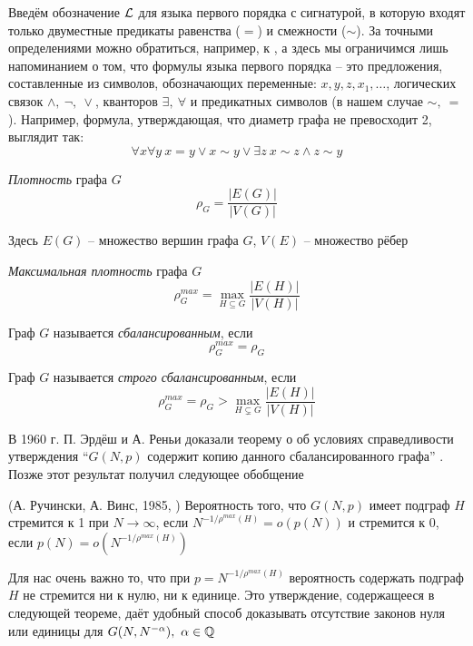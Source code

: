     Введём обозначение $\mathcal{L}$ для языка первого порядка с сигнатурой, в которую входят только двуместные предикаты равенства ($=$) и смежности ($\sim$).
    За точными определениями можно обратиться, например, к
    \cite{shen}, а здесь мы ограничимся лишь напоминанием о том, что формулы языка первого порядка -- это предложения, составленные из символов, обозначающих переменные: 
    $x,y,z,x_1,\ldots$, 
    логических связок 
    $\wedge, ~\neg, ~\vee$, 
    кванторов 
    $\exists, ~\forall$ и 
    предикатных символов (в нашем случае
    $\sim, ~ =$).
    Например, формула, утверждающая, что диаметр графа не превосходит 2, выглядит так:
    \[
    \forall x \forall y ~ x=y \vee x\sim y \vee \exists z ~ x \sim z \wedge z \sim y
    \]
    
    \Def \textit{Плотность} графа $G$ 
   \[ \rho_G = \frac {|E(G)|}{|V(G)|} \]
   
   Здесь $E(G)$ -- множество вершин графа $G$, $V(E)$ -- множество рёбер
   
   \Def \textit{Максимальная плотность} графа $G$
     \[ \rho^{max}_G = \max_{H \subseteq G} \frac {|E(H)|}{|V(H)|} \]
    
    \Def Граф $G$ называется \textit{сбалансированным}, если 
    \[ \rho^{max}_G = \rho_G \]
    
    \Def Граф $G$ называется \textit{строго сбалансированным}, если 
    \[\rho^{max}_G = \rho_G > \max_{H \subsetneq G} \frac {|E(H)|}{|V(H)|} \]
     
В 1960 г. П. Эрдёш и А. Реньи
доказали теорему о об условиях справедливости утверждения “$G(N, p)$ содержит копию данного сбалансированного графа” \cite{erdHos1976evolution}. 
Позже этот результат получил следующее обобщение
    
\begin{theorem} (А. Ручински, А. Винс, 1985, \cite{rucinski1985balanced}) 
\label{th:ruchinski}
Вероятность того, что $G(N, p)$ имеет подграф $H$ стремится к 1 при $N \rightarrow \infty$, если $N^{-1/\rho^{max}(H)} = o(p(N))$ и стремится к  0, если $p(N) = o\left(N^{-1/\rho^{max}(H)}\right)$

\end{theorem}

Для нас очень важно то, что при $p = N^{-1/\rho^{max}(H)}$ вероятность содержать подграф $H$ не стремится ни к нулю, ни к единице.
Это утверждение, содержащееся в следующей теореме, даёт удобный способ доказывать отсутствие законов нуля или единицы для $G(N, N^{-\alpha}), ~\alpha \in \mathbb {Q}$

